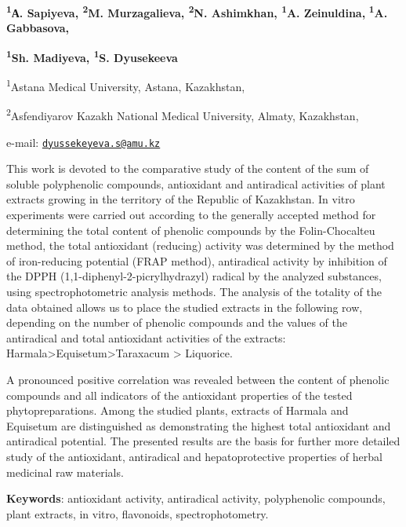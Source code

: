 {\bfseries \textsuperscript{1}А. Sapiyeva, \textsuperscript{2}M.
Murzagalieva, \textsuperscript{2}N. Ashimkhan, \textsuperscript{1}A.
Zeinuldina,} {\bfseries \textsuperscript{1}A. Gabbasova,}

{\bfseries \textsuperscript{1}Sh. Madiyeva, \textsuperscript{1}S.
Dyusekeeva}\textsuperscript{\envelope }

\textsuperscript{1}Astana Medical University, Astana, Kazakhstan,

\textsuperscript{2}Asfendiyarov Kazakh National Medical University,
Almaty, Kazakhstan,

e-mail:
\href{mailto:dyussekeyeva.s@amu.kz}{\nolinkurl{dyussekeyeva.s@amu.kz}}

This work is devoted to the comparative study of the content of the sum
of soluble polyphenolic compounds, antioxidant and antiradical
activities of plant extracts growing in the territory of the Republic of
Kazakhstan. In vitro experiments were carried out according to the
generally accepted method for determining the total content of phenolic
compounds by the Folin-Chocalteu method, the total antioxidant
(reducing) activity was determined by the method of iron-reducing
potential (FRAP method), antiradical activity by inhibition of the DPPH
(1,1-diphenyl-2-picrylhydrazyl) radical by the analyzed substances,
using spectrophotometric analysis methods. The analysis of the totality
of the data obtained allows us to place the studied extracts in the
following row, depending on the number of phenolic compounds and the
values of the antiradical and total antioxidant activities of the
extracts: Harmala\textgreater Equisetum\textgreater Taraxacum
\textgreater{} Liquorice.

A pronounced positive correlation was revealed between the content of
phenolic compounds and all indicators of the antioxidant properties of
the tested phytopreparations. Among the studied plants, extracts of
Harmala and Equisetum are distinguished as demonstrating the highest
total antioxidant and antiradical potential. The presented results are
the basis for further more detailed study of the antioxidant,
antiradical and hepatoprotective properties of herbal medicinal raw
materials.

{\bfseries Keywords}: antioxidant activity, antiradical activity,
polyphenolic compounds, plant extracts, in vitro, flavonoids,
spectrophotometry.

